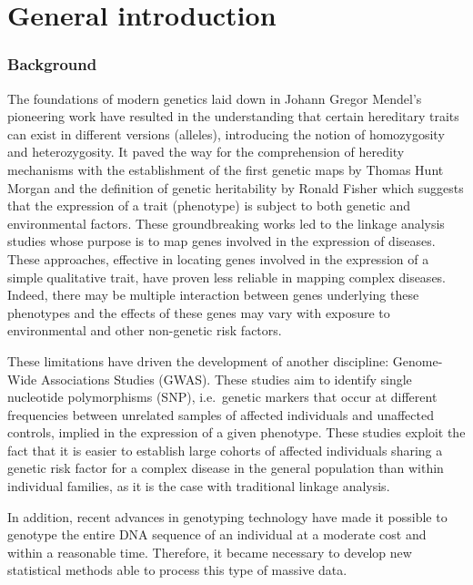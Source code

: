 \documentclass[]{book}
\begin{document}
\hypertarget{intro}{%
\chapter*{General introduction}\label{intro}}

\hypertarget{background}{%
\subsection*{Background}\label{background}}

The foundations of modern genetics laid down in Johann Gregor Mendel's
pioneering work have resulted in the understanding that certain
hereditary traits can exist in different versions (alleles), introducing
the notion of homozygosity and heterozygosity. It paved the way for the
comprehension of heredity mechanisms with the establishment of the first
genetic maps by Thomas Hunt Morgan and the definition of genetic
heritability by Ronald Fisher which suggests that the expression of a
trait (phenotype) is subject to both genetic and environmental factors.
These groundbreaking works led to the linkage analysis studies whose
purpose is to map genes involved in the expression of diseases. These
approaches, effective in locating genes involved in the expression of a
simple qualitative trait, have proven less reliable in mapping complex
diseases. Indeed, there may be multiple interaction between genes
underlying these phenotypes and the effects of these genes may vary with
exposure to environmental and other non-genetic risk factors.

These limitations have driven the development of another discipline:
Genome-Wide Associations Studies (GWAS). These studies aim to identify
single nucleotide polymorphisms (SNP), i.e.~genetic markers that occur
at different frequencies between unrelated samples of affected
individuals and unaffected controls, implied in the expression of a
given phenotype. These studies exploit the fact that it is easier to
establish large cohorts of affected individuals sharing a genetic risk
factor for a complex disease in the general population than within
individual families, as it is the case with traditional linkage
analysis.

In addition, recent advances in genotyping technology have made it
possible to genotype the entire DNA sequence of an individual at a
moderate cost and within a reasonable time. Therefore, it became
necessary to develop new statistical methods able to process this type
of massive data.
\end{document}
